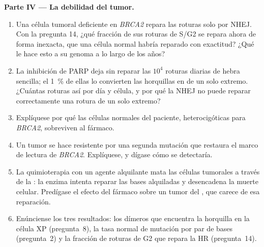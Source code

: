 \begin{problem}
\medskip
\noindent\textbf{Parte IV --- La debilidad del tumor.}
\begin{enumerate}[resume]
  \item Una célula tumoral deficiente en \emph{BRCA2} repara las roturas
        solo por NHEJ. Con la pregunta 14, ¿qué fracción de sus roturas
        de S/G2 se repara ahora de forma inexacta, que una célula normal
        habría reparado con exactitud? ¿Qué le hace esto a su genoma a lo
        largo de los años?
  \item La inhibición de PARP deja sin reparar las $10^{4}$ roturas
        diarias de hebra sencilla; el \qty{1}{\%} de ellas lo convierten
        las horquillas en  de un solo extremo.
        ¿Cuántas roturas así por día y célula, y por qué la NHEJ no puede
        reparar correctamente una rotura de un solo extremo?
  \item Explíquese por qué las células normales del paciente,
        heterocigóticas para \emph{BRCA2}, sobreviven al fármaco.
  \item Un tumor se hace resistente por una segunda mutación que
        restaura el marco de lectura de \emph{BRCA2}. Explíquese, y
        dígase cómo se detectaría.
  \item La quimioterapia con un agente alquilante mata las células
        tumorales a través de la :
        la enzima intenta reparar las bases alquiladas y desencadena la
        muerte celular. Predígase el efecto del fármaco sobre un tumor
        del , que carece de esa reparación.
  \item Enúnciense los tres resultados: los dímeros que encuentra la
        horquilla en la célula XP (pregunta~8), la tasa normal de
        mutación por par de bases (pregunta~2) y la fracción de roturas
        de G2 que repara la HR (pregunta~14).
\end{enumerate}
\end{problem}
